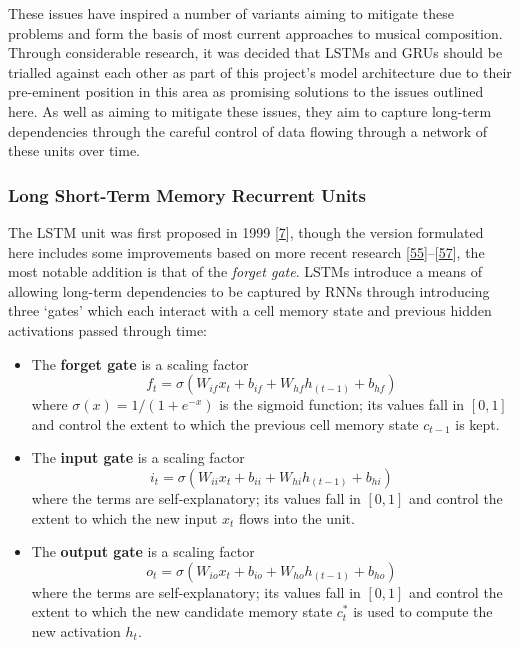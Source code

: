 \documentclass[12pt,]{article}
\providecommand{\tightlist}{%
  \setlength{\itemsep}{0pt}\setlength{\parskip}{0pt}}
\begin{document}
These issues have inspired a number of variants aiming to mitigate these
problems and form the basis of most current approaches to musical
composition. Through considerable research, it was decided that LSTMs
and GRUs should be trialled against each other as part of this project's
model architecture due to their pre-eminent position in this area as
promising solutions to the issues outlined here. As well as aiming to
mitigate these issues, they aim to capture long-term dependencies
through the careful control of data flowing through a network of these
units over time.

\hypertarget{long-short-term-memory-recurrent-units}{%
\subsubsection{Long Short-Term Memory Recurrent
Units}\label{long-short-term-memory-recurrent-units}}

The LSTM unit was first proposed in 1999
{[}\protect\hyperlink{ref-gers1999learning}{7}{]}, though the version
formulated here includes some improvements based on more recent research
{[}\protect\hyperlink{ref-sak2014long}{55}{]}--{[}\protect\hyperlink{ref-zebin2018human}{57}{]},
the most notable addition is that of the \emph{forget gate}. LSTMs
introduce a means of allowing long-term dependencies to be captured by
RNNs through introducing three `gates' which each interact with a cell
memory state and previous hidden activations passed through time:

\begin{itemize}
\tightlist
\item
  The \textbf{forget gate} is a scaling factor
  \[f_t = \sigma(W_{if} x_t + b_{if} + W_{hf} h_{(t-1)} + b_{hf})\]
  where \(\sigma(x) = 1 / (1 + e^{-x})\) is the sigmoid function; its
  values fall in \([0,1]\) and control the extent to which the previous
  cell memory state \(c_{t-1}\) is kept.
\item
  The \textbf{input gate} is a scaling factor
  \[i_t = \sigma(W_{ii} x_t + b_{ii} + W_{hi} h_{(t-1)} + b_{hi})\]
  where the terms are self-explanatory; its values fall in \([0,1]\) and
  control the extent to which the new input \(x_t\) flows into the unit.
\item
  The \textbf{output gate} is a scaling factor
  \[o_t = \sigma(W_{io} x_t + b_{io} + W_{ho} h_{(t-1)} + b_{ho})\]
  where the terms are self-explanatory; its values fall in \([0,1]\) and
  control the extent to which the new candidate memory state \(c^*_t\)
  is used to compute the new activation \(h_t\).
\end{itemize}
\end{document}
